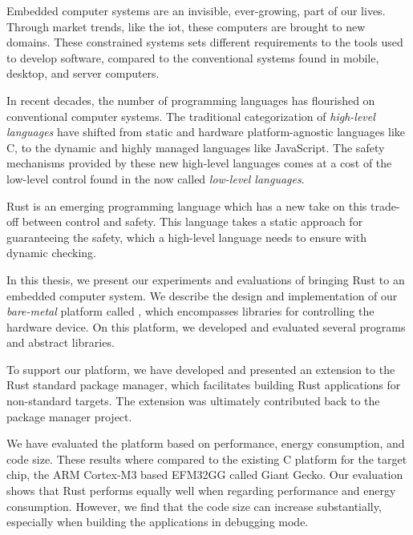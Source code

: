 
\label{chap:abstract}

Embedded computer systems are an invisible, ever-growing, part of our lives.
Through market trends, like the \glsdesc{iot}, these computers are brought to new domains.
These constrained systems sets different requirements to the tools used to develop software, compared to the conventional systems found in mobile, desktop, and server computers.

In recent decades, the number of programming languages has flourished on conventional computer systems.
The traditional categorization of \emph{high-level languages} have shifted from static and hardware platform-agnostic languages like C, to the dynamic and highly managed languages like JavaScript.
The safety mechanisms provided by these new high-level languages comes at a cost of the low-level control found in the now called \emph{low-level languages}.

Rust is an emerging programming language which has a new take on this trade-off between control and safety.
This language takes a static approach for guaranteeing the safety, which a high-level language needs to ensure with dynamic checking.

In this thesis, we present our experiments and evaluations of bringing Rust to an embedded computer system.
We describe the design and implementation of our \emph{bare-metal} platform called {\rg}, which encompasses libraries for controlling the hardware device.
On this platform, we developed and evaluated several programs and abstract libraries.

To support our platform, we have developed and presented an extension to the Rust standard package manager, which facilitates building Rust applications for non-standard targets.
The extension was ultimately contributed back to the package manager project.

We have evaluated the platform based on performance, energy consumption, and code size.
These results where compared to the existing C platform for the target chip, the ARM Cortex-M3 based EFM32GG called Giant Gecko.
Our evaluation shows that Rust performs equally well when regarding performance and energy consumption.
However, we find that the code size can increase substantially, especially when building the applications in debugging mode.

